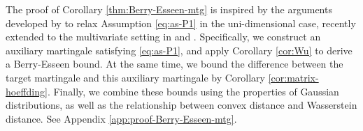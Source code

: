 The proof of Corollary \ref{thm:Berry-Esseen-mtg} is inspired by the arguments developed by \cite{rollin2018} to relax Assumption \eqref{eq:as-P1} in the uni-dimensional case, recently extended to the multivariate setting in 
\citet[][Lemma B.8]{cattaneo2024yurinskiiscouplingmartingales} and \citet[][Theorem 2.1]{
belloni2018highdimensionalcentrallimit}.
Specifically, we construct an auxiliary martingale satisfying \eqref{eq:as-P1}, and apply Corollary \ref{cor:Wu} to derive a Berry-Esseen bound. At the same time, we bound the difference between the target martingale and this auxiliary martingale by Corollary \ref{cor:matrix-hoeffding}. Finally, we combine these bounds using the properties of Gaussian distributions, as well as the relationship between convex distance and Wasserstein distance. 
See Appendix \ref{app:proof-Berry-Esseen-mtg}. %



